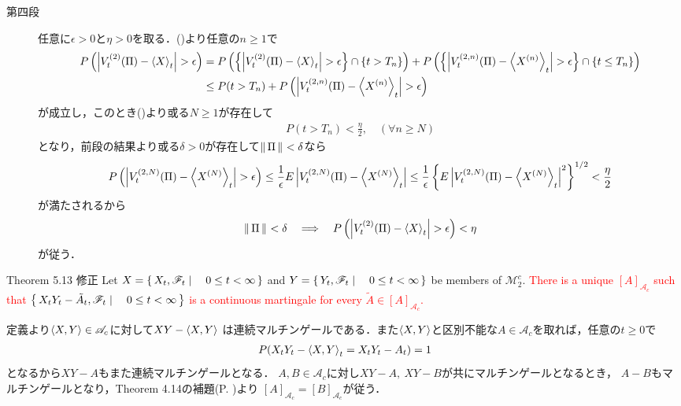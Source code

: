 \begin{prf}
\begin{description}
			\item[第四段]
				任意に$\epsilon > 0$と$\eta > 0$を取る．()より任意の$n \geq 1$で
				\begin{align}
					P\left(\left|V_t^{(2)}(\Pi) - \inprod<X>_t\right| > \epsilon\right)
					&= P\left(\left\{\left|V_t^{(2)}(\Pi) - \inprod<X>_t\right| > \epsilon\right\} \cap \{t > T_n\}\right)
						+ P\left(\left\{\left|V_t^{(2,n)}(\Pi) - \inprod<X^{(n)}>_t\right| > \epsilon\right\} \cap \{t \leq T_n\}\right) \\
					&\leq P(t > T_n) + P\left(\left|V_t^{(2,n)}(\Pi) - \inprod<X^{(n)}>_t\right| > \epsilon\right)
				\end{align}
				が成立し，このとき()より或る$N \geq 1$が存在して
				\begin{align}
					P(t > T_n) < \frac{\eta}{2},\quad (\forall n \geq N)
				\end{align}
				となり，前段の結果より或る$\delta > 0$が存在して$\left\|\, \Pi\, \right\|_{} < \delta$なら
				\begin{align}
					P\left(\left|V_t^{(2,N)}(\Pi) - \inprod<X^{(N)}>_t\right| > \epsilon\right)
					\leq \frac{1}{\epsilon} E\left|V_t^{(2,N)}(\Pi) - \inprod<X^{(N)}>_t\right|
					\leq \frac{1}{\epsilon} \left\{E\left|V_t^{(2,N)}(\Pi) - \inprod<X^{(N)}>_t\right|^2 \right\}^{1/2}
					< \frac{\eta}{2}
				\end{align}
				が満たされるから
				\begin{align}
					\Norm{\Pi}{} < \delta
					\quad \Longrightarrow \quad 
					P\left(\left|V_t^{(2)}(\Pi) - \inprod<X>_t\right| > \epsilon\right) < \eta
				\end{align}
				が従う．
				\QED
		\end{description}
	\end{prf}
	
	\begin{itembox}[l]{Theorem 5.13 修正}
		Let $X = \left\{\, X_t,\mathscr{F}_t \mid \quad 0 \leq t < \infty\, \right\}$ and $Y = \left\{\, Y_t,\mathscr{F}_t \mid \quad 0 \leq t < \infty\, \right\}$
		be members of $\mathscr{M}_2^c$. \textcolor{red}{There is a unique $[A]_{\mathscr{A}_c}$ such that
		$\left\{\, X_t Y_t - \tilde{A}_t,\mathscr{F}_t \mid \quad 0 \leq t < \infty\, \right\}$ is a continuous martingale
		for every $\tilde{A} \in [A]_{\mathscr{A}_c}$.}
	\end{itembox}
	
	\begin{prf}
		定義より$\inprod<X,Y> \in \mathscr{A}_c$に対して$XY - \inprod<X,Y>$
		は連続マルチンゲールである．また$\inprod<X,Y>$と区別不能な$A \in \mathscr{A}_c$を取れば，任意の$t \geq 0$で
		\begin{align}
			P(X_t Y_t - \inprod<X,Y>_t = X_t Y_t - A_t) = 1
		\end{align}
		となるから$XY-A$もまた連続マルチンゲールとなる．
		$A,B \in \mathscr{A}_c$に対し$XY - A,\ XY-B$が共にマルチンゲールとなるとき，
		$A - B$もマルチンゲールとなり，Theorem 4.14の補題(P. \pageref{lem:uniqueness_of_Doob_Meyer_decomposition})より
		$[A]_{\mathscr{A}_c} = [B]_{\mathscr{A}_c}$が従う．
		\QED
	\end{prf}
	
